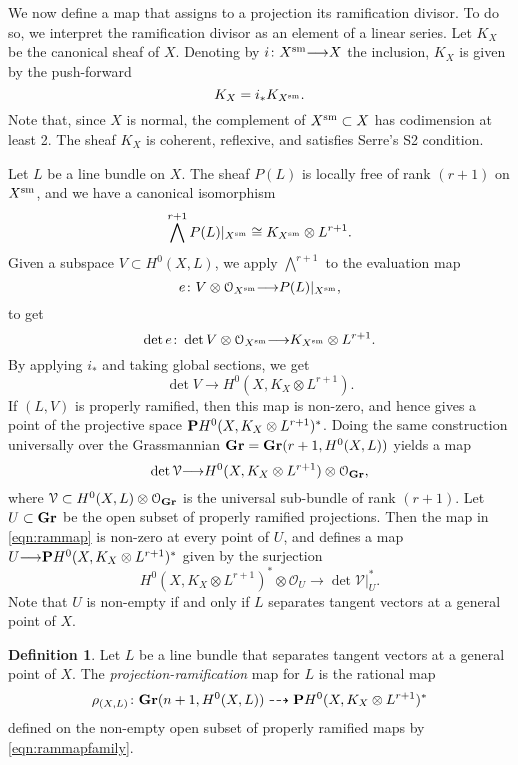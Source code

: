 \documentclass[11pt,reqno]{amsart}
\theoremstyle{plain}
\theoremstyle{definition}
\newtheorem{definition}[theorem]{Definition}
\theoremstyle{remark}
\numberwithin{equation}{section}
\renewcommand{\to}{{\longrightarrow}}
\numberwithin{equation}{section}
\renewcommand{\O}{\mathcal O}
\begin{document}
We now define a map that assigns to a projection its ramification divisor.
To do so, we interpret the ramification divisor as an element of a linear series.
Let $K_X$ be the canonical sheaf of $X$.
Denoting by $i \from X^{\rm sm} \to X$ the inclusion, $K_X$ is given by the push-forward
\[ K_X = i_* K_{X^{\rm sm}}.\]
Note that, since $X$ is normal, the complement of $X^{\rm sm} \subset X$ has codimension at least 2.
The sheaf $K_X$ is coherent, reflexive, and satisfies Serre's S2 condition.

Let $L$ be a line bundle on $X$.
The sheaf $P(L)$ is locally free of rank $(r+1)$ on $X^{\rm sm}$, and we have a canonical isomorphism
\[ \bigwedge^{r+1} P(L) |_{X^{\rm sm}} \cong K_{X^{\rm sm}} \otimes L^{r+1}.\]
Given a subspace $V \subset H^0(X, L)$, we apply $\bigwedge^{r+1}$ to the evaluation map
\[ e \from V \otimes \O_{X^{\rm sm}} \to P(L)|_{X^{\rm sm}},\]
to get
\[ \det e \from \det V \otimes \O_{X^{\rm sm}} \to K_{X^{\rm sm}} \otimes L^{r+1}. \]
By applying $i_*$ and taking global sections, we get
\[ \det V \to H^0(X, K_X \otimes L^{r+1}).\]
If $(L, V)$ is properly ramified, then this map is non-zero, and hence gives a point of the projective space $\P H^0(X, K_X \otimes L^{r+1})^*$.
Doing the same construction universally over the Grassmannian $\Gr = \Gr(r+1, H^0(X,L))$ yields a map
\begin{equation}\label{eqn:rammap}
  \det \mathcal V \to H^0(X, K_X \otimes L^{r+1}) \otimes \O_{\Gr},
\end{equation}
where $\mathcal V \subset H^0(X, L) \otimes \O_{\Gr}$ is the universal sub-bundle of rank $(r+1)$.
Let $U \subset \Gr$ be the open subset of properly ramified projections.
Then the map in \eqref{eqn:rammap} is non-zero at every point of $U$, and defines a map $U \to \P H^0(X, K_X \otimes L^{r+1})^*$ given by the surjection
\begin{equation}\label{eqn:rammapfamily}
  H^0(X, K_X \otimes L^{r+1})^* \otimes \O_{U} \to \det \mathcal V|_U^*.
\end{equation}
Note that $U$ is non-empty if and only if $L$ separates tangent vectors at a general point of $X$.
\begin{definition}
  \label{def:ProjectionRamification}
  Let $L$ be a line bundle that separates tangent vectors at a general point of $X$.
  The \emph{projection-ramification} map for $L$ is the rational map
  \[
    \rho_{(X,L)} \from \Gr(n+1, H^0(X, L)) \dashrightarrow \P H^0(X, K_X \otimes L^{r+1})^*
  \]
  defined on the non-empty open subset of properly ramified maps by \eqref{eqn:rammapfamily}.
\end{definition}
\end{document}
